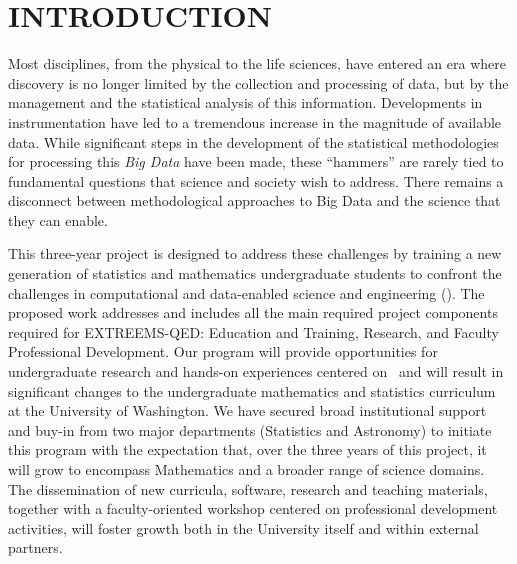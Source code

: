 \section{ INTRODUCTION}

Most disciplines, from the physical to the life sciences, have entered
an era where discovery is no longer limited by the collection and
processing of data, but by the management and the statistical analysis
of this information. Developments in instrumentation have led to a
tremendous increase in the magnitude of available data.
While significant steps in the development
of the statistical methodologies for processing this {\it Big Data} have been
made, these ``hammers'' are rarely tied to fundamental questions that
science and society wish to address. There remains a disconnect
between methodological approaches to Big Data and the science that
they can enable.

This three-year project is designed to 
address these challenges by training a new generation of statistics
and mathematics undergraduate students to confront the challenges in
computational and data-enabled science and engineering (\cdse).  The
proposed work addresses and includes all the main required project
components required for EXTREEMS-QED: Education and Training,
Research, and Faculty Professional Development. Our program will
provide opportunities for undergraduate research and hands-on
experiences centered on \cdse\ and will result in significant changes
to the undergraduate mathematics and statistics curriculum at the
University of Washington. We have secured broad institutional support
and buy-in from two major departments (Statistics and Astronomy) to
initiate this program with the expectation that, over the three years
of this project, it will grow to encompass Mathematics and a broader
range of science domains. The dissemination of new curricula, software,
research and teaching materials, together with a faculty-oriented
workshop centered on professional development activities, will foster
growth both in the University itself and within external partners.




